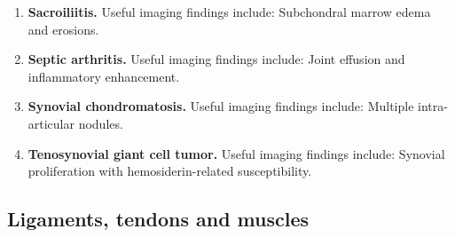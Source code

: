 \begin{enumerate}[leftmargin=*,itemsep=0.45em,topsep=0.4em]
\item \textbf{Sacroiliitis.} Useful imaging findings include: Subchondral marrow edema and erosions.
\item \textbf{Septic arthritis.} Useful imaging findings include: Joint effusion and inflammatory enhancement.
\item \textbf{Synovial chondromatosis.} Useful imaging findings include: Multiple intra-articular nodules.
\item \textbf{Tenosynovial giant cell tumor.} Useful imaging findings include: Synovial proliferation with hemosiderin-related susceptibility.
\end{enumerate}

\subsection{Ligaments, tendons and muscles}
